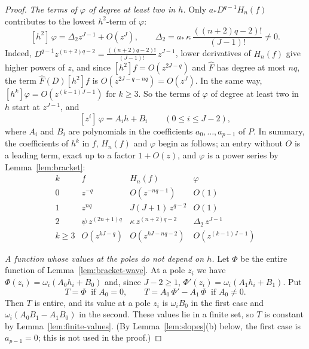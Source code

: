 \documentclass[11pt]{article}
\theoremstyle{definition}
\theoremstyle{remark}
\numberwithin{equation}{section}
\newcommand{\hatt}[1]{\widehat{#1}}
\begin{document}
\begin{proof}
\emph{The terms of \(\varphi\) of degree at least two in \(h\).} Only \(a_*D^{q-1}H_n(f)\) contributes to the lowest
\(h^2\)-term of \(\varphi\):
\begin{equation}\label{eq:Delta2}
 [h^2]\,\varphi=\Delta_2z^{J-1}+O(z^J),\qquad
 \Delta_2=a_*\,\kappa\,\frac{((n+2)q-2)!}{(J-1)!}\ne0.
\end{equation}
Indeed, \(D^{q-1}z^{(n+2)q-2}=\frac{((n+2)q-2)!}{(J-1)!}\,z^{J-1}\),
lower derivatives of \(H_n(f)\) give higher powers of \(z\), and since
\([h^2]f=O(z^{2J-q})\) and \(\hatt F\) has degree at most \(nq\), the
term \(\hatt F(D)[h^2]f\) is \(O(z^{2J-q-nq})=O(z^J)\). In the same way,
\([h^k]\varphi=O(z^{(k-1)J-1})\) for \(k\ge3\). So the terms of
\(\varphi\) of degree at least two in \(h\) start at \(z^{J-1}\), and
\begin{equation}\label{eq:slopes}
 [z^i]\,\varphi=A_ih+B_i\qquad(0\le i\le J-2),
\end{equation}
where \(A_i\) and \(B_i\) are polynomials in the coefficients
\(a_0,\dots,a_{p-1}\) of \(P\). In summary, the coefficients of \(h^k\) in
\(f\), \(H_n(f)\) and \(\varphi\) begin as follows; an entry without
\(O\) is a leading term, exact up to a factor \(1+O(z)\), and
\(\varphi\) is a power series by Lemma~\ref{lem:bracket}:
\begin{equation}\label{eq:leading-terms}
\begin{array}{c|ccc}
  k & f & H_n(f) & \varphi\\
 \hline
 0 & z^{-q} & O(z^{-nq-1}) & O(1)\\
 1 & z^{nq} & J(J+1)\,z^{q-2} & O(1)\\
 2 & \psi\,z^{(2n+1)q} & \kappa\,z^{(n+2)q-2} & \Delta_2\,z^{J-1}\\
 k\ge3 & O(z^{kJ-q}) & O(z^{kJ-nq-2}) & O(z^{(k-1)J-1})
\end{array}
\end{equation}

\emph{A function whose values at the poles do not depend on \(h\).} Let \(\Phi\) be the entire function of
Lemma~\ref{lem:bracket-wave}. At a pole \(z_i\) we have
\(\Phi(z_i)=\omega_i(A_0h_i+B_0)\) and, since \(J-2\ge1\),
\(\Phi'(z_i)=\omega_i(A_1h_i+B_1)\). Put
\[
 T=\Phi\ \text{ if } A_0=0,\qquad
 T=A_0\,\Phi'-A_1\,\Phi\ \text{ if } A_0\ne0.
\]
Then \(T\) is entire, and its value at a pole \(z_i\) is
\(\omega_iB_0\) in the first case and \(\omega_i(A_0B_1-A_1B_0)\) in the
second. These values lie in a finite set, so \(T\) is constant by
Lemma~\ref{lem:finite-values}. (By Lemma~\ref{lem:slopes}(b) below, the first case is \(a_{p-1}=0\);
this is not used in the proof.)


\end{proof}
\end{document}
